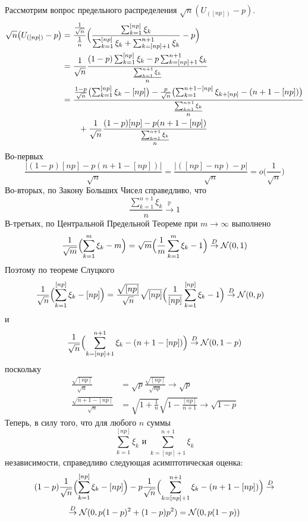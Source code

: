 \documentclass[a4paper]{article}
\newcommand{\Ncal}{\mathcal{N}}
\newcommand{\pr}[0]{{\mathbb{P}}}
\begin{document}
Рассмотрим вопрос предельного распределения $\sqrt{n}(U_{([np])} - p)$.
\begin{align*}
	\sqrt{n} \bigl( U_{([np])} - p \bigr)
	&= \frac{\frac{1}{\sqrt{n}}}{\frac{1}{n}}\Bigl(
		\frac{\sum_{k=1}^{[np]} \xi_k}{\sum_{k=1}^{[np]} \xi_k + \sum_{k=[np]+1}^{n+1} \xi_k} - p \Bigr)\\
	&= \frac{1}{\sqrt{n}}\frac{(1-p)\sum_{k=1}^{[np]} \xi_k - p \sum_{k=[np]+1}^{n+1} \xi_k}{\frac{\sum_{k=1}^{n+1} \xi_k}{n}}\\
	&= \frac{\frac{1-p}{\sqrt{n}}\bigl(\sum_{k=1}^{[np]} \xi_k - [np]\bigr)
			- \frac{p}{\sqrt{n}}\bigl(\sum_{k=1}^{n+1-[np]} \xi_{k+[np]} - (n+1-[np])\bigr)}{\frac{\sum_{k=1}^{n+1} \xi_k}{n}}\\
	&\quad \quad + \frac{1}{\sqrt{n}}\frac{(1-p)[np] - p(n+1-[np])}{\frac{\sum_{k=1}^{n+1} \xi_k}{n}}
\end{align*}
Во-первых
\[
\frac{\lvert(1-p)[np] - p(n+1-[np])\rvert}{\sqrt{n}}
= \frac{\lvert ([np] - np) - p\rvert}{\sqrt{n}}
= o\bigl(\frac{1}{\sqrt{n}}\bigr)
\]
Во-вторых, по Закону Больших Чисел справедливо, что
\[\frac{\sum_{k=1}^{n+1} \xi_k}{n} \overset{\pr}{\to} 1\]
В-третьих, по Центральной Предельной Теореме при $m\to \infty$ выполнено
\[
\frac{1}{\sqrt{m}}\Bigl(\sum_{k=1}^m \xi_k - m\Bigr)
= \sqrt{m}\Bigl(\frac{1}{m}\sum_{k=1}^m \xi_k - 1\Bigr)
\overset{D}{\to} \Ncal(0,1)
\]
Поэтому по теореме Слуцкого
\begin{align*}
	\frac{1}{\sqrt{n}}\Bigl(\sum_{k=1}^{[np]} \xi_k - [np]\Bigr)
	&= \frac{\sqrt{[np]}}{\sqrt{n}}
		\sqrt{[np]}\Bigl(\frac{1}{[np]}\sum_{k=1}^{[np]} \xi_k - 1\Bigr)
		\overset{D}{\to} \Ncal(0,p)
\end{align*}
и
\[\frac{1}{\sqrt{n}}\Bigl(\sum_{k=[np]+1}^{n+1} \xi_k - (n+1-[np])\Bigr) \overset{D}{\to} \Ncal(0,1-p)\]
поскольку
\begin{align*}
	\frac{\sqrt{[np]}}{\sqrt{n}}
	&= \sqrt{p} \frac{\sqrt{[np]}}{\sqrt{np}}
		\to \sqrt{p}\\
	\frac{\sqrt{n+1-[np]}}{\sqrt{n}}
	&= \sqrt{1+\frac{1}{n}} \sqrt{1-\frac{[np]}{n+1}}
		\to \sqrt{1-p}
\end{align*}
Теперь, в силу того, что для любого $n$ суммы
\[\sum_{k=1}^{[np]} \xi_k\text{ и }\sum_{k=[np]+1}^{n+1} \xi_k\]
независимости, справедливо следующая асимптотическая оценка:
\begin{multline*}
(1-p)\frac{1}{\sqrt{n}}\Bigl(\sum_{k=1}^{[np]} \xi_k - [np]\Bigr)
- p\frac{1}{\sqrt{n}}\Bigl(\sum_{k=[np]+1}^{n+1} \xi_k - (n+1-[np])\Bigr) \overset{D}{\to} \\
\overset{D}{\to} \Ncal(0, p(1-p)^2 + (1-p)p^2)
= \Ncal(0, p(1-p))
\end{multline*}
\end{document}
